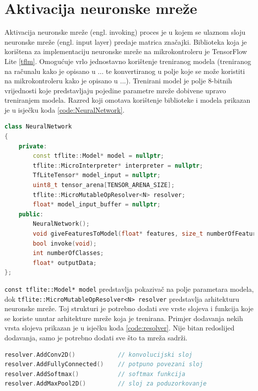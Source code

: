 \section{Aktivacija neuronske mreže}

Aktivacija neuronske mreže (engl. invoking) proces je u kojem se ulaznom sloju neuronske mreže 
(engl. input layer) predaje matrica značajki. Biblioteka koja je korištena za implementaciju
neuronske mreže na mikrokontroleru je TensorFlow Lite \ref{tflm}. Omogućuje vrlo jednostavno
korištenje treniranog modela (treniranog na računalu kako je opisano u ... te konvertiranog
u polje koje se može koristiti na mikrokontroleru kako je opisano u ...). Trenirani model
je polje 8-bitnih vrijednosti koje predstavljaju pojedine parametre mreže dobivene upravo 
treniranjem modela. Razred koji omotava korištenje biblioteke i modela prikazan je 
u isječku koda \ref{code:NeuralNetwork}. 

\begin{lstlisting}[language=C++, caption=Razred neuronske mreže, label=code:NeuralNetwork]
class NeuralNetwork
{
    private:
        const tflite::Model* model = nullptr;
        tflite::MicroInterpreter* interpreter = nullptr;
        TfLiteTensor* model_input = nullptr;
        uint8_t tensor_arena[TENSOR_ARENA_SIZE];
        tflite::MicroMutableOpResolver<N> resolver;
        float* model_input_buffer = nullptr;
    public:
        NeuralNetwork();
        void giveFeaturesToModel(float* features, size_t numberOfFeatures);
        bool invoke(void);
        int numberOfClasses;
        float* outputData;  
};   
\end{lstlisting}

\texttt{const tflite::Model* model} predstavlja 
pokazivač na polje parametara modela, dok \texttt{tflite::MicroMutableOpResolver<N> resolver}
predstavlja arhitekturu neuronske mreže. Toj strukturi je potrebno dodati sve vrste slojeva 
i funkcija koje se koriste unutar arhitekture mreže koja je trenirana. Primjer dodavanja 
nekih vrsta slojeva prikazan je u isječku koda \ref{code:resolver}. Nije bitan redoslijed 
dodavanja, samo je potrebno dodati sve što ta mreža sadrži.

\begin{lstlisting}[language=C++, caption=Gradnja arhitekture mreže, label=code:resolver]
resolver.AddConv2D()            // konvolucijski sloj
resolver.AddFullyConnected()    // potpuno povezani sloj
resolver.AddSoftmax()           // softmax funkcija
resolver.AddMaxPool2D()         // sloj za poduzorkovanje
\end{lstlisting}

